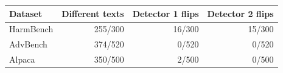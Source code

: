 \begin{tabular}{lrrr}
\toprule
Dataset & Different texts & Detector 1 flips & Detector 2 flips \\
\midrule
HarmBench & 255/300 & 16/300 & 15/300 \\
AdvBench & 374/520 & 0/520 & 0/520 \\
Alpaca & 350/500 & 2/500 & 0/500 \\
\bottomrule
\end{tabular}
